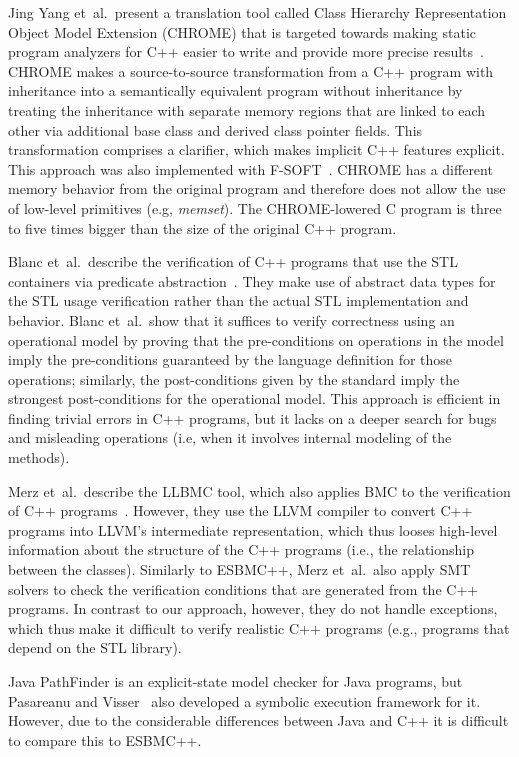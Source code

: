\documentclass[conference]{IEEEtran}
\begin{document}
Jing Yang et~al.\ present a translation tool called Class Hierarchy
Representation Object Model Extension (CHROME) that is targeted towards
making static program analyzers for C++ easier to write and provide
more precise results~\cite{Yang12}. CHROME makes a source-to-source transformation
from a C++ program with inheritance into a semantically equivalent program without
inheritance by treating the inheritance with separate memory regions
that are linked to each other via additional base class and derived class
pointer fields. This transformation comprises a clarifier, which makes
implicit C++ features explicit. This approach was also implemented with
F-SOFT~\cite{Fsoft}. CHROME has a
different memory behavior from the original program and therefore does not allow
the use of low-level primitives (e.g, \textit{memset}). The CHROME-lowered C program is
three to five times bigger than the size of the original C++ program.

Blanc et~al.\ describe the verification of C++ programs that use the STL containers
via predicate abstraction~\cite{Blanc07}. They make use of abstract data types for the STL
usage verification rather than the actual STL implementation and behavior.
Blanc et~al.\ show that it suffices to verify correctness using an operational model
by proving that the pre-conditions on operations in the model imply the pre-conditions
guaranteed by the language definition for those operations; similarly, the post-conditions
given by the standard imply the strongest post-conditions for the operational model.
This approach is efficient in finding trivial errors in C++ programs, but it lacks
on a deeper search for bugs and misleading operations (i.e, when it involves internal
modeling of the methods).

Merz et~al.\ describe the LLBMC tool, which also applies BMC to the verification
of C++ programs~\cite{Florian12}. However, they use the LLVM compiler to convert C++
programs into LLVM's intermediate representation, which thus looses high-level
information about the structure of the C++ programs (i.e., the relationship between
the classes). Similarly to ESBMC++, Merz et~al.\ also apply SMT solvers to check the verification
conditions that are generated from the C++ programs. In contrast to our approach, however,
they do not handle exceptions, which thus make it difficult to verify realistic C++ programs
(e.g., programs that depend on the STL library).

Java PathFinder is an explicit-state model checker for Java programs, but
Pasareanu and Visser~\cite{Pasareanu04} also developed a symbolic execution
framework for it. However, due to the considerable differences between
Java and C++ it is difficult to compare this to ESBMC++.
\end{document}
